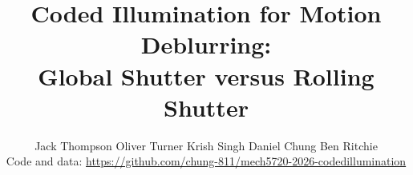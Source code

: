 \documentclass[10pt,journal,compsoc]{IEEEtran}
\title{Coded Illumination for Motion Deblurring:\\
  Global Shutter versus Rolling Shutter}
\author{
  Jack Thompson \quad Oliver Turner \quad Krish Singh \quad Daniel Chung \quad Ben Ritchie\\
  {\small Code and data: \url{https://github.com/chung-811/mech5720-2026-codedillumination}}   
}
\newif\ifpeerreview
\newcommand{\paperID}{XXXX}
\begin{document}
\IEEEtitleabstractindextext{%
\begin{abstract}

\end{abstract}
}


\ifpeerreview
\linenumbers \linenumbersep 15pt\relax 
\author{Paper ID \paperID\IEEEcompsocitemizethanks{\IEEEcompsocthanksitem This paper is under review for ICCP 2026 and the PAMI special issue on computational photography. Do not distribute.}}
\markboth{Anonymous ICCP 2026 submission ID \paperID}%
{}
\fi
\maketitle
















\ifpeerreview \else





\fi
\end{document}
